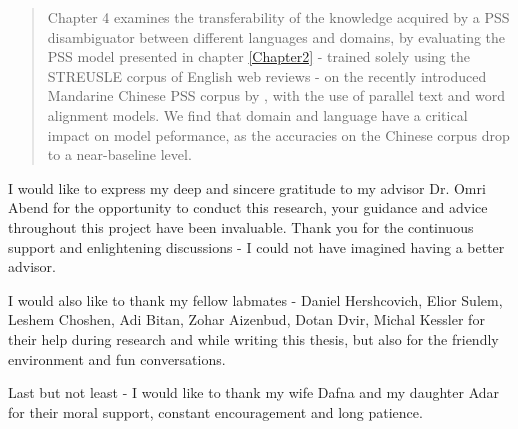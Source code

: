 \documentclass[
11pt, %
oneside, %
hebrew, english,
singlespacing, %
nohyperref, %
headsepline, %
]{MastersDoctoralThesis} %
\begin{document}
\begin{abstract}
Chapter 4 examines the transferability of the knowledge acquired by a PSS
disambiguator between different languages and domains, by evaluating
the PSS model presented in chapter \ref{Chapter2} - trained solely using the STREUSLE corpus of English web reviews - on the recently introduced Mandarine Chinese PSS corpus
by \cite{chinesecorpus}, with the use of parallel text and word alignment models. We find that domain and language have a critical impact on model peformance, as the accuracies on the Chinese corpus drop to a near-baseline level.

\end{abstract}


\begin{acknowledgements}
\addchaptertocentry{\acknowledgementname} %

I would like to express my deep and sincere gratitude to my advisor Dr. Omri Abend for the opportunity to conduct this research, your guidance and advice throughout this project have been invaluable. Thank you for the continuous support and enlightening discussions - I could not have imagined having a better advisor. 

I would also like to thank my fellow labmates - Daniel Hershcovich, Elior Sulem, Leshem Choshen, Adi Bitan, Zohar Aizenbud, Dotan Dvir, Michal Kessler for their help during research and while writing this thesis, but also for the friendly environment and fun conversations. 

Last but not least - I would like to thank my wife Dafna and my daughter Adar for their moral support, constant encouragement and long patience.
\end{acknowledgements}


\tableofcontents %


\end{document}
